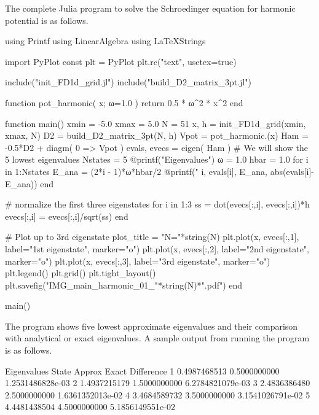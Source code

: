 The complete Julia program to solve the Schroedinger equation for harmonic potential
is as follows.

\begin{juliacode}
using Printf
using LinearAlgebra
using LaTeXStrings
  
import PyPlot
const plt = PyPlot
plt.rc("text", usetex=true)

include("init_FD1d_grid.jl")
include("build_D2_matrix_3pt.jl")
  
function pot_harmonic( x; ω=1.0 )
    return 0.5 * ω^2 * x^2
end
  
function main()
    xmin = -5.0
    xmax =  5.0
    N = 51
    x, h = init_FD1d_grid(xmin, xmax, N)
    D2 = build_D2_matrix_3pt(N, h)
    Vpot = pot_harmonic.(x)
    Ham = -0.5*D2 + diagm( 0 => Vpot )
    evals, evecs = eigen( Ham )
    # We will show the 5 lowest eigenvalues
    Nstates = 5
    @printf("Eigenvalues\n")
    ω = 1.0
    hbar = 1.0
    for i in 1:Nstates
        E_ana = (2*i - 1)*ω*hbar/2
        @printf("%
          i, evals[i], E_ana, abs(evals[i]-E_ana))
    end
  
    # normalize the first three eigenstates
    for i in 1:3
        ss = dot(evecs[:,i], evecs[:,i])*h
        evecs[:,i] = evecs[:,i]/sqrt(ss)
    end
  
    # Plot up to 3rd eigenstate
    plot_title = "N="*string(N)
    plt.plot(x, evecs[:,1],
      label="1st eigenstate", marker="o")
    plt.plot(x, evecs[:,2],
      label="2nd eigenstate", marker="o")
    plt.plot(x, evecs[:,3],
      label="3rd eigenstate", marker="o")
    plt.legend()
    plt.grid()
    plt.tight_layout()
    plt.savefig("IMG_main_harmonic_01_"*string(N)*".pdf")
end

main()
\end{juliacode}

The program shows five lowest approximate eigenvalues and their comparison with analytical or
exact eigenvalues. A sample output from running the program is as follows.
\begin{fullwidth}
\begin{textcode}
Eigenvalues
State         Approx              Exact          Difference
   1       0.4987468513       0.5000000000   1.2531486828e-03
   2       1.4937215179       1.5000000000   6.2784821079e-03
   3       2.4836386480       2.5000000000   1.6361352013e-02
   4       3.4684589732       3.5000000000   3.1541026791e-02
   5       4.4481438504       4.5000000000   5.1856149551e-02 
\end{textcode}
\end{fullwidth}

